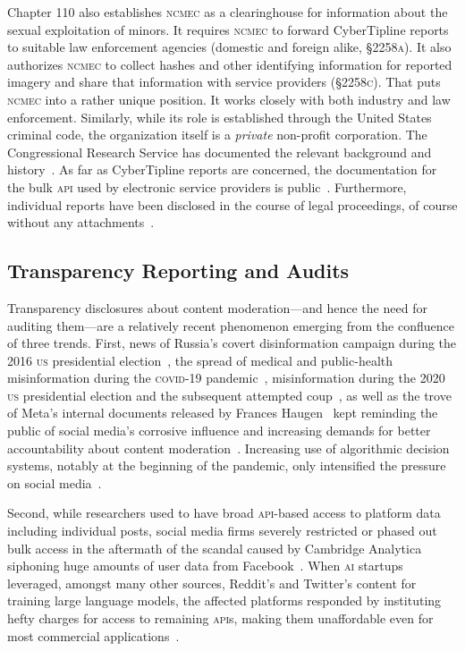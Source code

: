 \documentclass[nonacm,screen]{acmart}
\newcommand\V[1]{\textsc{\MakeLowercase{#1}}}
\begin{document}
\begin{itemize}
{Chapter 110 also establishes \V{NCMEC} as a clearinghouse for information about
the sexual exploitation of minors. It requires \V{NCMEC} to forward CyberTipline
reports to suitable law enforcement agencies (domestic and foreign alike,
\V{\S2258A}). It also authorizes \V{NCMEC} to collect hashes and other
identifying information for reported imagery and share that information with
service providers (\V{\S2258C}). That puts \V{NCMEC} into a rather unique
position. It works closely with both industry and law enforcement. Similarly,
while its role is established through the United States criminal code, the
organization itself is a \emph{private} non-profit corporation. The
Congressional Research Service has documented the relevant background and
history~\cite{FernandesAlcantaraHanson2021}. As far as CyberTipline reports are
concerned, the documentation for the bulk \V{API} used by electronic service
providers is public~\cite{NCMEC2024}. Furthermore, individual reports have been
disclosed in the course of legal proceedings, of course without any
attachments~\cite{NationalCenterForMissingAndExploitedChildren2017,
NationalCenterForMissingAndExploitedChildren2017a}.


\subsection{Transparency Reporting and Audits}

Transparency disclosures about content moderation---and hence the need for
auditing them---are a relatively recent phenomenon emerging from the confluence
of three trends. First, news of Russia's covert disinformation campaign during
the 2016 \V{US} presidential election~\cite{Francoisdouek2021}, the spread of
medical and public-health misinformation during the \V{COVID-19}
pandemic~\cite{ChoLiea2023,FoleyGurakar2022,GreenhalghOzbilginea2022},
misinformation during the 2020 \V{US} presidential election and the subsequent
attempted coup~\cite{JacksonConroyea2023,SilvermanTimbergea2022}, as well as the
trove of Meta's internal documents released by Frances
Haugen~\cite{CameronWodinskyea2023, ElliottChristopherea2021} kept reminding the
public of social media's corrosive influence and increasing demands for better
accountability about content
moderation~\cite{HaimsonDelmonacoea2021,KozyrevaHerzogea2023}. Increasing use of
algorithmic decision systems, notably at the beginning of the pandemic, only
intensified the pressure on social media~\cite{ScottKayali2020}.

Second, while researchers used to have broad \V{API}-based access to platform
data including individual posts, social media firms severely restricted or
phased out bulk access in the aftermath of the scandal caused by Cambridge
Analytica siphoning huge amounts of user data from
Facebook~\cite{Bruns2019,Puschmann2019,WalkerMerceaea2019}. When \V{AI} startups
leveraged, amongst many other sources, Reddit's and Twitter's content for
training large language models, the affected platforms responded by instituting
hefty charges for access to remaining \V{API}s, making them unaffordable even
for most commercial applications~\cite{Isaac2023}.

}
\end{itemize}
\end{document}

